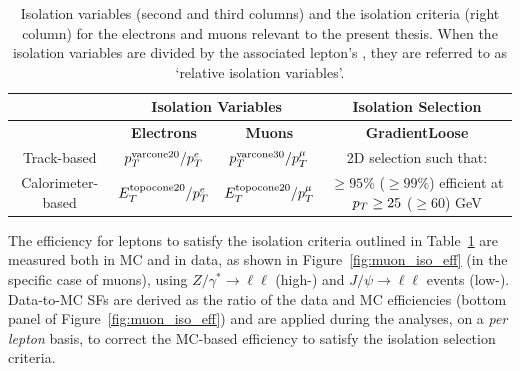 \begin{table}[!htb]
    \begin{small}
    \begin{center}
        \caption{
            Isolation variables (second and third columns) and the isolation criteria (right column) for the electrons
            and muons relevant to the present thesis.
            When the isolation variables are divided by the associated lepton's \pT, they are referred to as
            `relative isolation variables'.
        }
        \label{tab:isolation_selection}
        \begin{tabular}{c | c c | c}
            \hline
            \hline
                & \multicolumn{2}{c|}{\textbf{Isolation Variables}} & \textbf{Isolation Selection} \\
                \hline
                & \textbf{Electrons} & \textbf{Muons} & \textbf{GradientLoose}\\
                \cline{2-4}
                Track-based & $p_{T}^{\text{varcone20}}/p_{T}^e$ & $p_{T}^{\text{varcone30}}/p_{T}^{\mu}$ & 2D selection such that: \\ %
                Calorimeter-based & $E_T^{\text{topocone20}}/p_{T}^e$ &  $E_T^{\text{topocone20}}/p_{T}^{\mu}$ & $\ge 95\%$ ($\ge 99\%$) efficient at $p_{T} \ge 25$ ($\ge 60$) GeV \\
            \hline
            \hline
        \end{tabular}
    \end{center}
    \end{small}
\end{table}

The efficiency for leptons to satisfy the isolation criteria outlined in Table~\ref{tab:isolation_selection}
are measured both in MC and in data, as shown in Figure~\ref{fig:muon_iso_eff} (in the specific case of muons), using $Z/\gamma^* \rightarrow \ell \ell$ (high-\pT)
and $J/\psi \rightarrow \ell \ell$ events (low-\pT).
Data-to-MC SFs are derived  as the ratio of the data and MC efficiencies (bottom panel of Figure~\ref{fig:muon_iso_eff}) and are applied
during the analyses, on a \textit{per lepton} basis, to correct
the MC-based efficiency to satisfy the isolation selection criteria.


